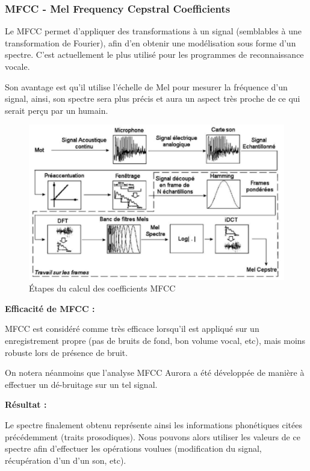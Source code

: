 \documentclass[a4paper, 12pt]{book}
\newcounter{program}[subsection]
\begin{document}
\subsubsection{MFCC - Mel Frequency Cepstral Coefficients}

Le MFCC permet d'appliquer des transformations à un signal (semblables à une transformation de Fourier), afin d'en obtenir une modélisation sous forme d'un spectre. C'est actuellement le plus utilisé pour les programmes de reconnaissance vocale.

Son avantage est qu'il utilise l'échelle de Mel pour mesurer la fréquence d'un signal, ainsi,
son spectre sera plus précis et aura un aspect très proche de ce qui serait perçu par un humain.

\begin{figure}[htbp]
  \centering
  \includegraphics[width=1\linewidth]{fig/mfcc.png}
  \caption{Étapes du calcul des coefficients MFCC}
\end{figure}


\textbf{Efficacité de MFCC :}

MFCC est considéré comme très efficace lorsqu'il est appliqué sur un enregistrement propre (pas de bruits de fond, bon volume vocal, etc), mais moins robuste lors de présence de bruit.

On notera néanmoins que l'analyse MFCC Aurora a été développée de manière à effectuer un dé-bruitage sur un tel signal.



\textbf{Résultat :}

Le spectre finalement obtenu représente ainsi les informations phonétiques citées précédemment (traits prosodiques). Nous pouvons alors utiliser les valeurs de ce spectre afin d'effectuer les opérations voulues (modification du signal, récupération d'un d'un son, etc).
\end{document}
